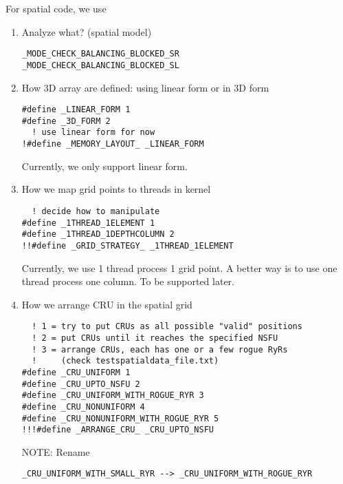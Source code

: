 For spatial code, we use
\begin{enumerate}
\item Analyze what? (spatial model)
\begin{verbatim}
_MODE_CHECK_BALANCING_BLOCKED_SR
_MODE_CHECK_BALANCING_BLOCKED_SL
\end{verbatim}

\item How 3D array are defined: using linear form or in 3D form
\begin{verbatim}
#define _LINEAR_FORM 1
#define _3D_FORM 2
  ! use linear form for now
!#define _MEMORY_LAYOUT_ _LINEAR_FORM
\end{verbatim}
Currently, we only support linear form.

\item How we map grid points to threads in kernel
\begin{verbatim}
  ! decide how to manipulate
#define _1THREAD_1ELEMENT 1
#define _1THREAD_1DEPTHCOLUMN 2  
!!#define _GRID_STRATEGY_ _1THREAD_1ELEMENT
\end{verbatim}
Currently, we use 1 thread process 1 grid point. A better way is to use one
thread process one column. To be supported later.


\item How we arrange CRU in the spatial grid
\begin{verbatim}
  ! 1 = try to put CRUs as all possible "valid" positions
  ! 2 = put CRUs until it reaches the specified NSFU
  ! 3 = arrange CRUs, each has one or a few rogue RyRs 
  !     (check testspatialdata_file.txt)  
#define _CRU_UNIFORM 1
#define _CRU_UPTO_NSFU 2
#define _CRU_UNIFORM_WITH_ROGUE_RYR 3
#define _CRU_NONUNIFORM 4
#define _CRU_NONUNIFORM_WITH_ROGUE_RYR 5
!!!#define _ARRANGE_CRU_ _CRU_UPTO_NSFU
\end{verbatim}

NOTE: Rename
\begin{verbatim}
_CRU_UNIFORM_WITH_SMALL_RYR --> _CRU_UNIFORM_WITH_ROGUE_RYR
\end{verbatim}


\end{enumerate}
